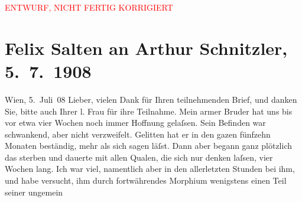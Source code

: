 
\begin{center}
            \textcolor{red}{ENTWURF, NICHT FERTIG KORRIGIERT}
                      \end{center}
            
         
         \renewcommand{\erwaehntePersonen}{Personen: Ottilie Salten, Michael Emil Salzmann, Marie Salzmann, Olga Schnitzler}
         \renewcommand{\erwaehnteOrte}{Orte: Bayreuth, Franzensbad, Noordwijk, Salzkammergut, Wien}
         \renewcommand{\erwaehnteWerke}{}
               \section[Felix Salten an Arthur Schnitzler, 5. 7. 1908]{ Felix Salten an Arthur Schnitzler, 5. 7. 1908}\nopagebreak{}\rehead{ }\begin{ledgroupsized}[t]{13cm}\normalsize\beginnumbering \toendnotes[C]{\smallbreak\pagebreak[2]} 
\toendnotes[C]{\smallbreak}\pstart
           \raggedleft{}{\pb}Wien, 5. Juli 08\pend
           \pstart
           Lieber, vielen Dank für Ihren teilnehmenden Brief, und danken Sie,
               bitte auch Ihrer l. Frau für
               ihre Teilnahme. Mein armer Bruder hat uns bis vor etwa vier Wochen noch immer Hoffnung gelaſsen. Sein
               Befinden war schwankend, aber nicht verzweifelt. Gelitten hat er in den gazen
               fünfzehn Monaten beständig, mehr als sich sagen läſst. Dann aber begann ganz
               plötzlich das sterben und dauerte mit allen Qualen, die sich nur denken laſsen, vier
               Wochen lang. Ich war viel, namentlich aber in den allerletzten Stunden bei ihm, und
               habe versucht, ihm durch fortwährendes Morphium wenigstens einen Teil seiner ungemein

\end{ledgroupsized}
